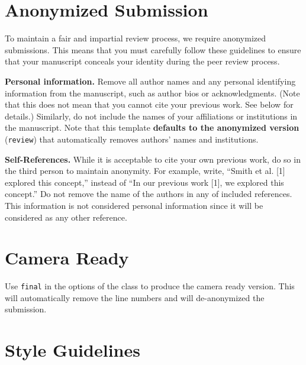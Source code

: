 \documentclass[fullpaper]{nldl}
\begin{document}
\section{Anonymized Submission}
\label{sec:anon}

To maintain a fair and impartial review process, we require anonymized submissions.
This means that you must carefully follow these guidelines to ensure that your manuscript conceals your identity during the peer review process.

\noindent\textbf{Personal information.}
Remove all author names and any personal identifying information from the manuscript, such as author bios or acknowledgments.
(Note that this does not mean that you cannot cite your previous work.
See below for details.)
Similarly, do not include the names of your affiliations or institutions in the manuscript.
Note that this template \textbf{defaults to the anonymized version} (\verb|review|) that automatically removes authors' names and institutions.

\noindent\textbf{Self-References.}
While it is acceptable to cite your own previous work, do so in the third person to maintain anonymity.
For example, write, ``Smith et al. [1] explored this concept,'' instead of ``In our previous work [1], we explored this concept.''
Do not remove the name of the authors in any of included references.
This information is not considered personal information since it will be considered as any other reference.

\section{Camera Ready}

Use \verb|final| in the options of the class to produce the camera ready version.
This will automatically remove the line numbers and will de-anonymized the submission.

\section{Style Guidelines}
\end{document}
